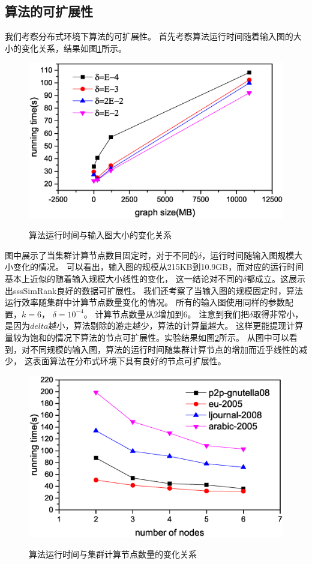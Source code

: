 \documentclass[master]{njuthesis}
\begin{document}
\subsection{算法的可扩展性}
我们考察分布式环境下算法的可扩展性。 首先考察算法运行时间随着输入图的大小的变化关系，结果如图\ref{fig:ch1:data_scalable}所示。
\begin{figure}[htbp]
  \centering
  \includegraphics[width= 1\textwidth]{figure/data_scalability.eps}\\
  \caption{算法运行时间与输入图大小的变化关系}\label{fig:ch1:data_scalable}
\end{figure}

图中展示了当集群计算节点数目固定时，对于不同的$\delta$，运行时间随输入图规模大小变化的情况。 
可以看出，输入图的规模从215KB到10.9GB，而对应的运行时间基本上近似的随着输入规模大小线性的变化，
这一结论对不同的$\delta$都成立。这展示出sssSimRank良好的数据可扩展性。
我们还考察了当输入图的规模固定时，算法运行效率随集群中计算节点数量变化的情况。
所有的输入图使用同样的参数配置，$k=6$， $\delta=10^{-4}$。 计算节点数量从2增加到6。
注意到我们把$\delta$取得非常小，是因为$delta$越小，算法剔除的游走越少，算法的计算量越大。
这样更能提现计算量较为饱和的情况下算法的节点可扩展性。实验结果如图\ref{fig:ch1:node_scalable}所示。
从图中可以看到，对不同规模的输入图，算法的运行时间随集群计算节点的增加而近乎线性的减少，
这表面算法在分布式环境下具有良好的节点可扩展性。
\begin{figure}[htbp]
  \centering
  \includegraphics[width= 1\textwidth]{figure/node_scalability.eps}\\
  \caption{算法运行时间与集群计算节点数量的变化关系}\label{fig:ch1:node_scalable}
\end{figure}
\end{document}

